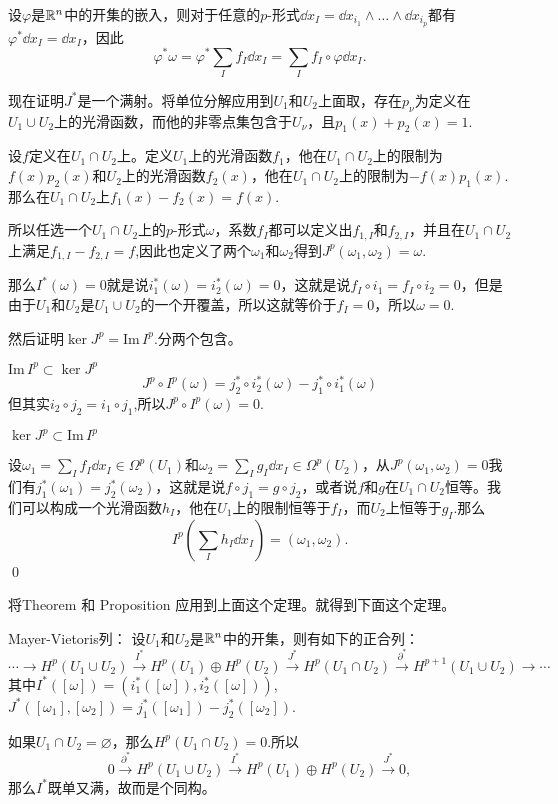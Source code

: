 设$\varphi$是$\mathbb{R}^n$中的开集的嵌入，则对于任意的$p$-形式$\dd x_I=\dd x_{i_1}\wedge\dots\wedge\dd x_{i_p}$都有$\varphi^* \dd x_I =\dd x_I$，因此
\[
\varphi^*\omega=\varphi^*\sum_If_I\dd x_I=\sum_If_I\circ\varphi \dd x_I.
\]

现在证明$J^*$是一个满射。将单位分解应用到$U_1$和$U_2$上面取，存在$p_\nu$为定义在$U_1\cup U_2$上的光滑函数，而他的非零点集包含于$U_\nu$，且$p_1(x)+p_2(x)=1$.

设$f$定义在$U_1\cap U_2$上。定义$U_1$上的光滑函数$f_1$，他在$U_1\cap U_2$上的限制为$f(x)p_2(x)$和$U_2$上的光滑函数$f_2(x)$，他在$U_1\cap U_2$上的限制为$-f(x)p_1(x)$.那么在$U_1\cap U_2$上$f_1(x)-f_2(x)=f(x)$.

所以任选一个$U_1\cap U_2$上的$p$-形式$\omega$，系数$f_I$都可以定义出$f_{1,I}$和$f_{2,I}$，并且在$U_1\cap U_2$上满足$f_{1,I}-f_{2,I}=f$,因此也定义了两个$\omega_1$和$\omega_2$得到$J^p(\omega_1,\omega_2)=\omega$.

那么$I^*(\omega)=0$就是说$i_1^*(\omega)=i_2^*(\omega)=0$，这就是说$f_I\circ i_1=f_I\circ i_2=0$，但是由于$U_1$和$U_2$是$U_1\cup U_2$的一个开覆盖，所以这就等价于$f_I=0$，所以$\omega=0$.

然后证明$\ker J^p=\mathrm{Im}\, I^p$.分两个包含。

 $\mathrm{Im}\, I^p\subset \ker J^p$
\[
J^p\circ I^p(\omega)=j_2^*\circ i_2^*(\omega)-j_1^*\circ i_1^*(\omega)
\]
但其实$i_2\circ j_2=i_1\circ j_1$,所以$J^p\circ I^p(\omega)=0$.

 $\ker J^p\subset \mathrm{Im}\, I^p$

设$\omega_1=\sum_I f_I \dd x_I\in \Omega^p(U_1)$和$\omega_2=\sum_I g_I \dd x_I\in \Omega^p(U_2)$，从$J^p(\omega_1,\omega_2)=0$我们有$j_1^*(\omega_1)=j_2^*(\omega_2)$，这就是说$f\circ j_1=g\circ j_2$，或者说$f$和$g$在$U_1\cap U_2$恒等。我们可以构成一个光滑函数$h_I$，他在$U_1$上的限制恒等于$f_I$，而$U_2$上恒等于$g_I$.那么
\[
I^p\left(\sum_Ih_I\dd x_I\right)=(\omega_1,\omega_2).
\]\qed

将Theorem  和 Proposition  应用到上面这个定理。就得到下面这个定理。

\theo Mayer-Vietoris列：
设$U_1$和$U_2$是$\mathbb{R}^n$中的开集，则有如下的正合列：
\[
\cdots\to H^p(U_1\cup U_2)\xrightarrow{I^*}H^p(U_1)\oplus H^p(U_2)\xrightarrow{J^*}H^p(U_1\cap U_2)\xrightarrow{\partial^*}H^{p+1}(U_1\cup U_2)
\to \cdots
\]
其中$I^*([\omega])=(i_1^*([\omega]),i_2^*([\omega]))$,$J^*([\omega_1],[\omega_2])=j_1^*([\omega_1])-j_2^*([\omega_2])$.

如果$U_1\cap U_2=\varnothing$，那么$H^p(U_1\cap U_2)=0$.所以
\[
0\xrightarrow{\partial^*} H^p(U_1\cup U_2)\xrightarrow{I^*}H^p(U_1)\oplus H^p(U_2)\xrightarrow{J^*}0,
\]
那么$I^*$既单又满，故而是个同构。

